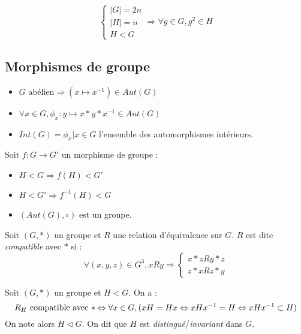 \begin{rem} \[\left\{\begin{array}{l} |G| = 2n \\ |H| = n \\ H < G \end{array}\right. \Rightarrow \forall g \in G, g^2 \in H \]
\end{rem}

\subsection{Morphismes de groupe}
\begin{prop} \begin{itemize}
    \item $G \text{ abélien} \Rightarrow (x \mapsto x^{-1}) \in Aut(G)$
    \item $\forall x \in G, \phi_x : y \mapsto x*y*x^{-1} \in Aut(G)$
    \item $Int(G) = {\phi_x | x \in G}$ l'ensemble des automorphismes intérieurs.
\end{itemize}\end{prop}

\begin{prop} Soit $f : G \rightarrow G'$ un morphisme de groupe :
\begin{itemize}
    \item $H < G \Rightarrow f(H) < G'$
    \item $H < G' \Rightarrow f^{-1}(H) < G$
    \item $(Aut(G), \circ)$ est un groupe.
\end{itemize}
\end{prop}

\begin{defi} Soit $(G, *)$ un groupe et $R$ une relation d'équivalence sur $G$. $R$ est dite \emph{compatible} avec $*$ si :
    \[ \forall (x, y, z) \in G^3, xRy \Rightarrow \left\{\begin{array}{l} x*zRy*z \\ z*xRz*y\end{array}\right. \]
\end{defi}

\begin{prop} Soit $(G, *)$ un groupe et $H < G$. On a : \[ R_H \text{ compatible avec } * \Leftrightarrow \forall x \in G, (xH = Hx \Leftrightarrow xHx^{-1} = H \Leftrightarrow xHx^{-1} \subset H) \]
    On note alors $H \lhd G$. On dit que $H$ est \emph{distingué}/\emph{invariant} dans $G$.
\end{prop}

